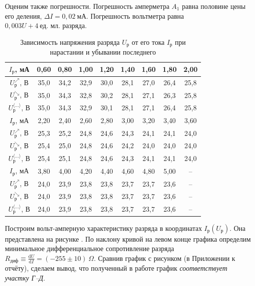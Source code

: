 \documentclass[a4paper,10pt]{article}
\begin{document}
Оценим также погрешности. Погрешность амперметра $A_1$ равна половине цены его деления, $\Delta I=0,02~\text{мА}$. Погрешность вольтметра равна $0,003U+4~\text{ед. мл. разряда}$.

\begin{table}[h]
	\centering
	\caption{Зависимость напряжения разряда $U_{\text{р}}$ от его тока $I_{\text{р}}$ при нарастании и убывании последнего} \label{VAH}
	\begin{tabular}{|c|c|c|c|c|c|c|c|c|}
		\hline
		$I_{\text{р}}$, мА & 0,60 & 0,80 & 1,00 & 1,20 & 1,40 & 1,60 & 1,80 & 2,00 \\ \hline
		$U_{\text{р}}^{\nearrow}$, В & 35,0 & 34,2 & 32,9 & 30,0 & 28,1 & 27,0 & 26,4 & 25,8 \\ \hline
		$U_{\text{р}}^{\searrow}$, В & 35,0 & 34,3 & 32,8 & 30,2 & 28,1 & 27,1 & 26,3 & 25,8 \\ \hline
		$U_{\text{р}}^{\langle\ldots\rangle}$, В & 35,0 & 34,3 & 32,9 & 30,1 & 28,1 & 27,1 & 26,4 & 25,8 \\ \hline
		\hline
		$I_{\text{р}}$, мА & 2,20 & 2,40 & 2,60 & 2,80 & 3,00 & 3,20 & 3,40 & 3,60 \\ \hline
		$U_{\text{р}}^{\nearrow}$, В & 25,3 & 25,2 & 24,8 & 24,6 & 24,3 & 24,1 & 24,1 & 24,0  \\ \hline
		$U_{\text{р}}^{\searrow}$, В & 25,4 & 25,0 & 24,8 & 24,6 & 24,2 & 24,0 & 24,0 & 24,0  \\ \hline
		$U_{\text{р}}^{\langle\ldots\rangle}$, В & 25,4 & 25,1 & 24,8 & 24,6 & 24,3 & 24,1 & 24,1 & 24,0 \\ \hline
		\hline
		$I_{\text{р}}$, мА & 3,80 & 4,00 & 4,20 & 4,40 & 4,60 & 4,80 & 5,00 & -- \\ \hline
		$U_{\text{р}}^{\nearrow}$, В & 24,0 & 23,9 & 23,8 & 23,8 & 23,7 & 23,7 & 23,6 & -- \\ \hline
		$U_{\text{р}}^{\searrow}$, В & 24,0 & 23,9 & 23,8 & 23,8 & 23,7 & 23,7 & 23,6 & -- \\ \hline
		$U_{\text{р}}^{\langle\ldots\rangle}$, В & 24,0 & 23,9 & 23,8 & 23,8 & 23,7 & 23,7 & 23,6 & -- \\ \hline
	\end{tabular}
\end{table}

Построим вольт-амперную характеристику разряда в координатах $I_{\text{р}}\left(U_{\text{р}}\right)$. Она представлена на рисунке . По наклону кривой на левом конце графика определим минимальное дифференциальное сопротивление разряда $R_{\text{диф}}\equiv\frac{\text{d}U}{\text{d}I}=\left(-255\pm10\right)~\Omega$. Сравнив график с рисунком  (в Приложении к отчёту), сделаем вывод, что полученный в работе график \textit{соответствует участку Г--Д}.
\end{document}

